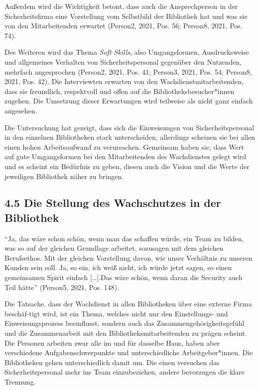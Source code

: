\documentclass[a4paper,
fontsize=11pt,
oneside,
numbers=noperiodatend,
parskip=half-,
bibliography=totoc,
final
]{scrartcl}
\begin{document}
Außerdem wird die Wichtigkeit betont, dass auch die Ansprechperson in
der Sicherheitsfirma eine Vorstellung vom Selbstbild der Bibliothek hat
und was sie von den Mitarbeitenden erwartet (Person2, 2021, Pos. 56;
Person8, 2021, Pos. 74).

Des Weiteren wird das Thema \emph{Soft Skills}, also Umgangsformen,
Ausdrucksweise und allgemeines Verhalten von Sicherheitspersonal
gegenüber den Nutzenden, mehrfach angesprochen (Person2, 2021, Pos. 41;
Person3, 2021, Pos. 54; Person8, 2021, Pos. 42). Die Interviewten
erwarten von den Wachdienstmitarbeitenden, dass sie freundlich,
respektvoll und offen auf die Bibliotheksbesucher*innen zugehen. Die
Umsetzung dieser Erwartungen wird teilweise als nicht ganz einfach
angesehen.

Die Untersuchung hat gezeigt, dass sich die Einweisungen von
Sicherheitspersonal in den einzelnen Bibliotheken stark unterscheiden,
allerdings scheinen sie bei allen einen hohen Arbeitsaufwand zu
verursachen. Gemeinsam haben sie, dass Wert auf gute Umgangsformen bei
den Mitarbeitenden des Wachdienstes gelegt wird und es scheint ein
Bedürfnis zu geben, diesen auch die Vision und die Werte der jeweiligen
Bibliothek näher zu bringen.

\hypertarget{die-stellung-des-wachschutzes-in-der-bibliothek}{%
\subsection{4.5 Die Stellung des Wachschutzes in der
Bibliothek}\label{die-stellung-des-wachschutzes-in-der-bibliothek}}

\begin{flushright}
\enquote{Ja, das wäre schon schön, wenn man das schaffen würde, ein Team
zu bilden, was so auf der gleichen Grundlage arbeitet, sozusagen mit dem
gleichen Berufsethos. Mit der gleichen Vorstellung davon, wie unser
Verhältnis zu unseren Kunden sein soll. Ja, so ein, ich weiß nicht, ich
würde jetzt sagen, so einen gemeinsamen Spirit einfach {[}\ldots{]}.Das
wäre schön, wenn daran die Security auch Teil hätte}
\linebreak
(Person5, 2021, Pos. 148).
\end{flushright}

Die Tatsache, dass der Wachdienst in allen Bibliotheken über eine
externe Firma beschäf-\linebreak tigt wird, ist ein Thema, welches nicht nur den
Einstellungs- und Einweisungsprozess beeinflusst, sondern auch das
Zusammengehörigkeitsgefühl und die Zusammenarbeit mit den
Bibliotheksmitarbeitenden zu prägen scheint. Die Personen arbeiten zwar
alle im und für dasselbe Haus, haben aber verschiedene
Aufgabenschwerpunkte und unterschiedliche Arbeitgeber*innen. Die
Bibliotheken gehen unterschiedlich damit um. Die einen versuchen das
Sicherheitspersonal mehr ins Team einzubeziehen, andere bevorzugen die
klare Trennung.
\end{document}

